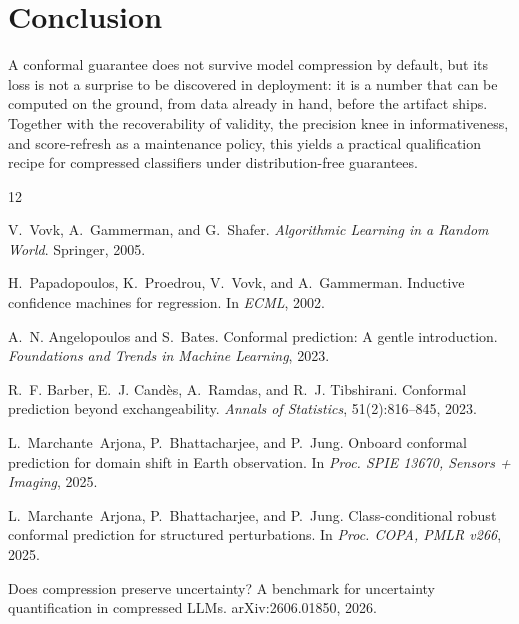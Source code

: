 \documentclass[11pt]{article}
\begin{document}
\section{Conclusion}

A conformal guarantee does not survive model compression by default, but its
loss is not a surprise to be discovered in deployment: it is a number that
can be computed on the ground, from data already in hand, before the artifact
ships. Together with the recoverability of validity, the precision knee in
informativeness, and score-refresh as a maintenance policy, this yields a
practical qualification recipe for compressed classifiers under
distribution-free guarantees.


\begin{thebibliography}{12}

V.~Vovk, A.~Gammerman, and G.~Shafer.
\newblock \emph{Algorithmic Learning in a Random World}.
\newblock Springer, 2005.

H.~Papadopoulos, K.~Proedrou, V.~Vovk, and A.~Gammerman.
\newblock Inductive confidence machines for regression.
\newblock In \emph{ECML}, 2002.

A.~N. Angelopoulos and S.~Bates.
\newblock Conformal prediction: A gentle introduction.
\newblock \emph{Foundations and Trends in Machine Learning}, 2023.

R.~F. Barber, E.~J. Cand\`es, A.~Ramdas, and R.~J. Tibshirani.
\newblock Conformal prediction beyond exchangeability.
\newblock \emph{Annals of Statistics}, 51(2):816--845, 2023.

L.~Marchante~Arjona, P.~Bhattacharjee, and P.~Jung.
\newblock Onboard conformal prediction for domain shift in Earth observation.
\newblock In \emph{Proc. SPIE 13670, Sensors + Imaging}, 2025.

L.~Marchante~Arjona, P.~Bhattacharjee, and P.~Jung.
\newblock Class-conditional robust conformal prediction for structured
  perturbations.
\newblock In \emph{Proc. COPA, PMLR v266}, 2025.

Does compression preserve uncertainty? A benchmark for uncertainty
  quantification in compressed LLMs.
\newblock arXiv:2606.01850, 2026.


\end{thebibliography}
\end{document}
